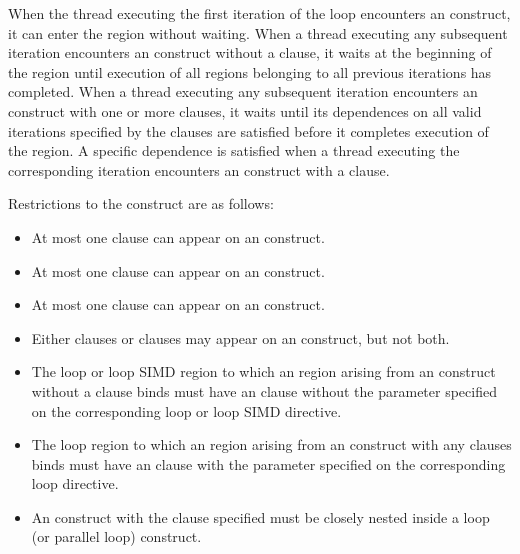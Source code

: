 {{{{When the thread executing the first iteration of the loop encounters an
 construct, it can enter the  region without
waiting. When a thread executing any subsequent iteration encounters an
 construct without a  clause, it waits at the
beginning of the  region until execution of all 
regions belonging to all previous iterations has completed. When a thread
executing any subsequent iteration encounters an  construct with
one or more  clauses, it waits until its dependences on 
all valid iterations specified by the  clauses
are satisfied before it completes execution of the  region.
A specific dependence is satisfied when a thread executing the corresponding
iteration encounters an  construct with a  clause.

\restrictions
Restrictions to the  construct are as follows:

\begin{itemize}
\item At most one  clause can appear on an  construct.

\item At most one  clause can appear on an  construct.

\item At most one  clause can appear on an  construct.

\item Either  clauses or 
clauses may appear on an  construct, but not both.

\item The loop or loop SIMD region to which an 
region arising from an  construct without a 
clause binds must have an  clause without the parameter
specified on the corresponding loop or loop SIMD directive.

\item The loop region to which an  region arising from an
 construct with any 
clauses binds must have an  clause with the parameter specified 
on the corresponding loop directive. 

\item An  construct with the  clause specified must
be closely nested inside a loop (or parallel loop) construct. 


\end{itemize}}}}}
